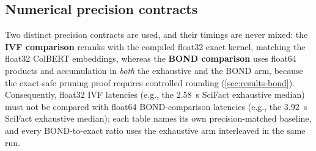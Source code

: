 \subsection{Numerical precision contracts}
\label{sec:precision}

Two distinct precision contracts are used, and their timings are never mixed:
the \textbf{IVF comparison} reranks with the compiled float32 exact kernel,
matching the float32 ColBERT embeddings, whereas the \textbf{BOND comparison}
uses float64 products and accumulation in \emph{both} the exhaustive and the
BOND arm, because the exact-safe pruning proof requires controlled rounding
(\cref{sec:results-bond}). Consequently, float32 IVF latencies (e.g., the
\SI{2.58}{\second} SciFact exhaustive median) must not be compared with
float64 BOND-comparison latencies (e.g., the \SI{3.92}{\second} SciFact
exhaustive median); each table names its own precision-matched baseline, and
every BOND-to-exact ratio uses the exhaustive arm interleaved in the same run.
